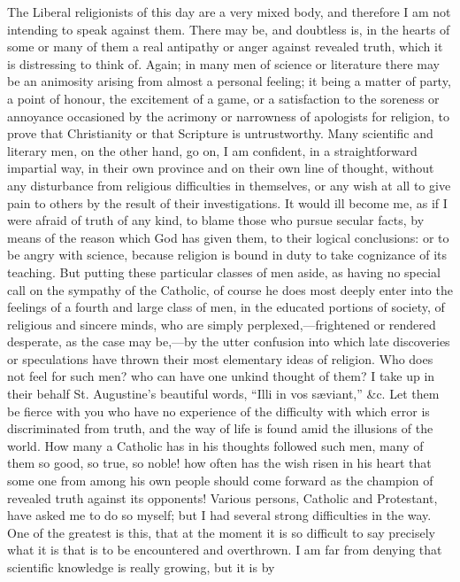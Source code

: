 The Liberal religionists of this day are a very mixed body, and
therefore I am not intending to speak against them. There may be, and
doubtless is, in the hearts of some or many of them a real antipathy or
anger against revealed truth, which it is distressing to think of. Again;
in many men of science or literature there may be an animosity arising
from almost a personal feeling; it being a matter of party, a point of
honour, the excitement of a game, or a satisfaction to the soreness
or annoyance occasioned by the acrimony or narrowness of apologists for
religion, to prove that Christianity or that Scripture is untrustworthy.
Many scientific and literary men, on the other hand, go on, I am
confident, in a straightforward impartial way, in their own province and
on their own line of thought, without any disturbance from religious
difficulties in themselves, or any wish at all to give pain to
others by the result of their investigations. It would ill become
me, as if I were afraid of truth of any kind, to blame those who pursue
secular facts, by means of the reason which God has given them, to their
logical conclusions: or to be angry with science, because
religion is bound in duty to take cognizance of its teaching.
But putting these particular classes of men aside, as having no special
call on the sympathy of the Catholic, of course he does most deeply
enter into the feelings of a fourth and large class of men, in the
educated portions of society, of religious and sincere minds, who are
simply perplexed,—frightened or rendered desperate, as the case may
be,—by the utter confusion into which late discoveries or speculations
have thrown their most elementary ideas of religion. Who does not feel
for such men? who can have one unkind thought of them? I take up in
their behalf St. Augustine's beautiful words, ``Illi in vos sæviant,'' \&c. Let them be fierce with you who have no
experience of the difficulty with which error is discriminated from
truth, and the way of life is found amid the illusions of the world. How
many a Catholic has in his thoughts followed such men, many
of them so good, so true, so noble! how often has the wish risen in his
heart that some one from among his own people should come forward as the champion of revealed truth against
its opponents! Various persons, Catholic and Protestant, have asked me
to do so myself; but I had several strong difficulties in the way. One
of the greatest is this, that at the moment it is so difficult to say
precisely what it is that is to be encountered and overthrown. I am far
from denying that scientific knowledge is really growing, but it is by
